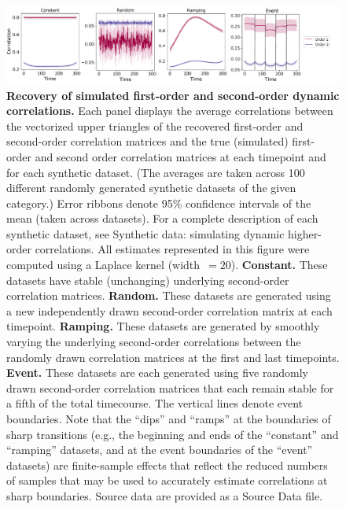 \documentclass[english]{article}
\begin{document}
\begin{figure}[tp]
  \centering
  \includegraphics[width=\textwidth]{figs/higher_order_sims}
  \caption{\textbf{Recovery of simulated first-order and second-order dynamic correlations.} Each panel displays the average correlations
    between the vectorized upper triangles of the recovered
    first-order and second-order correlation matrices and the true
    (simulated) first-order and second order correlation matrices at each
    timepoint and for each synthetic dataset.  (The averages are taken across 100 different
    randomly generated synthetic datasets of the given category.)
    Error ribbons denote 95\% confidence intervals of the mean (taken across
    datasets).  For a complete description of each synthetic dataset,
    see Synthetic data: simulating dynamic higher-order
      correlations.  All estimates represented in this figure were
    computed using a Laplace kernel
    (width~$=20$).  \textbf{Constant.} These datasets
    have stable (unchanging) underlying second-order correlation
    matrices. \textbf{Random.} These datasets are
    generated using a new independently drawn second-order correlation
    matrix at each timepoint. \textbf{Ramping.}
    These datasets are generated by smoothly varying the underlying
    second-order correlations between the randomly drawn correlation
    matrices at the first and last timepoints. \textbf{Event.}  These datasets are each generated using five
    randomly drawn second-order correlation matrices that each remain
    stable for a fifth of the total timecourse.  The
    vertical lines denote event boundaries.  Note that the ``dips''
    and ``ramps'' at the boundaries of sharp transitions (e.g., the
    beginning and ends of the ``constant'' and ``ramping'' datasets,
    and at the event boundaries of the ``event'' datasets) are
    finite-sample effects that reflect the reduced numbers of samples
    that may be used to accurately estimate correlations at sharp
    boundaries. Source data are provided as a Source Data file.}
  \label{fig:higher_order_sims}
\end{figure}
\end{document}
